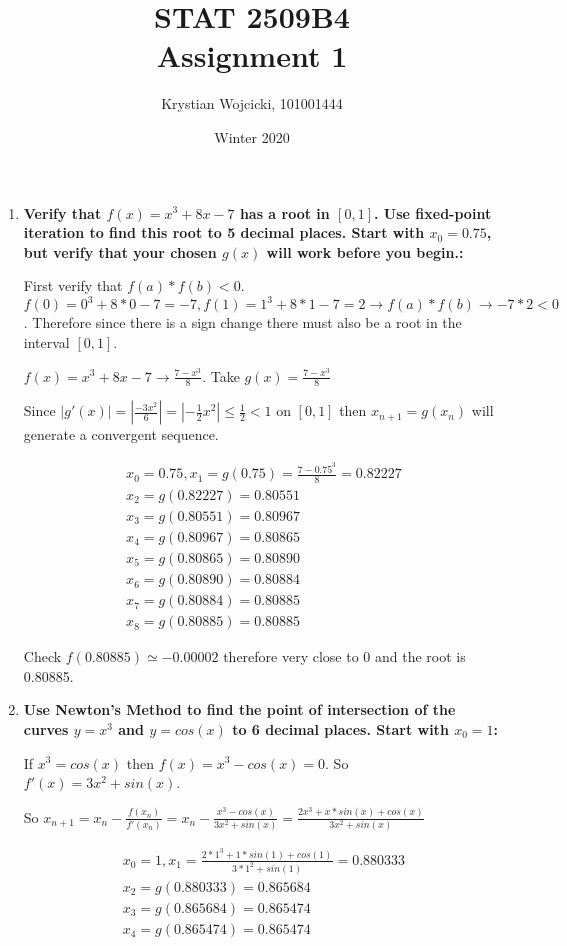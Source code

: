 \documentclass{article}
\title{STAT 2509B4 \\
	\large{Assignment 1}}
\author{Krystian Wojcicki, 101001444}
\date{Winter 2020}
\begin{document}
\maketitle

\begin{enumerate}[1.]
\item

\textbf{Verify that $f(x) = x^3 +8x - 7$ has a root in $[0,1]$.  Use fixed-point iteration to find this
root to 5 decimal places. Start with $x_0 = 0.75$, but verify that your chosen $g(x)$ will work
before you begin.:}

First verify that $f(a) * f(b) < 0$. $f(0) = 0^3 + 8 * 0 - 7 = -7, f(1) = 1^3 + 8 * 1- 7 = 2 \to f(a) * f(b) \to -7 * 2 < 0$. Therefore since there is a sign change there must also be a root in the interval $[0,1]$.

$f(x) = x^3 + 8x - 7 \to \frac{7 - x^3}{8}$. Take $g(x) = \frac{7 - x^3}{8}$

Since $|g\prime(x)| = |\frac{-3x^2}{6}| = |-\frac{1}{2}x^2|  \leq \frac{1}{2} < 1$ on $[0,1]$ then $x_{n+1} = g(x_n)$ will generate a convergent sequence.

\begin{gather*}
x_0 = 0.75, x_1 = g(0.75) = \frac{7 - 0.75^3}{8} = 0.82227 \\
x_2 = g(0.82227) = 0.80551 \\
x_3 = g(0.80551) = 0.80967 \\
x_4 = g(0.80967) = 0.80865 \\ 
x_5 = g(0.80865) = 0.80890 \\
x_6 = g(0.80890) = 0.80884 \\
x_7 = g(0.80884) = 0.80885 \\
x_8 = g(0.80885) = 0.80885
\end{gather*}

Check $f(0.80885) \simeq -0.00002$ therefore very close to 0 and the root is 0.80885.

\item
\textbf{Use Newton’s Method to find the point of intersection of the curves $y = x^3$ and $y = cos(x)$ to 6 decimal places. Start with $x_0 = 1$:}

If $x^3 = cos(x)$ then $f(x) = x^3 - cos(x) = 0$. So $f\prime(x) = 3x^2 + sin(x)$.

So $x_{n+1} = x_n - \frac{f(x_n)}{f\prime(x_n)} = x_n - \frac{x^3 - cos(x)}{3x^2 + sin(x)} = \frac{2x^3 + x * sin(x) + cos(x)}{3x^2 + sin(x)}$

\begin{gather*}
x_0 = 1, x_1 = \frac{2* 1^3 + 1 * sin(1) + cos(1)}{3 * 1^2 + sin(1)} = 0.880333 \\
x_2 = g(0.880333) = 0.865684 \\
x_3 = g(0.865684) = 0.865474 \\
x_4 = g(0.865474) = 0.865474 \\
\end{gather*}


\end{enumerate}
\end{document}

